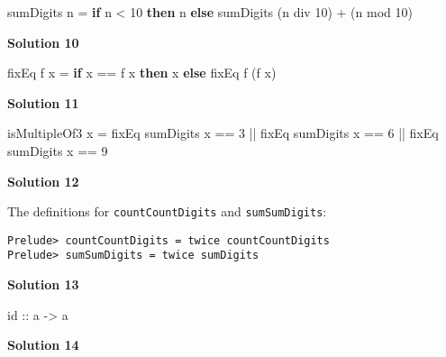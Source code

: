 \documentclass[11pt,
  american,
  DIV13]{article}
\newenvironment{Shaded}{}{}
\newcommand{\DecValTok}[1]{\textcolor[rgb]{0.25,0.63,0.44}{#1}}
\newcommand{\FunctionTok}[1]{\textcolor[rgb]{0.02,0.16,0.49}{#1}}
\newcommand{\KeywordTok}[1]{\textcolor[rgb]{0.00,0.44,0.13}{\textbf{#1}}}
\newcommand{\NormalTok}[1]{#1}
\newcommand{\OperatorTok}[1]{\textcolor[rgb]{0.40,0.40,0.40}{#1}}
\newcommand{\OtherTok}[1]{\textcolor[rgb]{0.00,0.44,0.13}{#1}}
\begin{document}
\begin{Shaded}
\begin{Highlighting}[]
\NormalTok{sumDigits n }\OtherTok{=} \KeywordTok{if}\NormalTok{ n }\OperatorTok{\textless{}} \DecValTok{10} \KeywordTok{then}\NormalTok{ n }\KeywordTok{else}\NormalTok{ sumDigits (n }\OtherTok{\textasciigrave{}div\textasciigrave{}} \DecValTok{10}\NormalTok{) }\OperatorTok{+}\NormalTok{ (n }\OtherTok{\textasciigrave{}mod\textasciigrave{}} \DecValTok{10}\NormalTok{)}
\end{Highlighting}
\end{Shaded}

\textbf{Solution 10}

\begin{Shaded}
\begin{Highlighting}[]
\NormalTok{fixEq f x }\OtherTok{=} \KeywordTok{if}\NormalTok{ x }\OperatorTok{==}\NormalTok{ f x }\KeywordTok{then}\NormalTok{ x }\KeywordTok{else}\NormalTok{ fixEq f (f x)}
\end{Highlighting}
\end{Shaded}

\textbf{Solution 11}

\begin{Shaded}
\begin{Highlighting}[]
\NormalTok{isMultipleOf3 x }\OtherTok{=}\NormalTok{ fixEq sumDigits x }\OperatorTok{==} \DecValTok{3} \OperatorTok{||}\NormalTok{ fixEq sumDigits x }\OperatorTok{==} \DecValTok{6} \OperatorTok{||}\NormalTok{ fixEq sumDigits x }\OperatorTok{==} \DecValTok{9}
\end{Highlighting}
\end{Shaded}

\textbf{Solution 12}

The definitions for \texttt{countCountDigits} and \texttt{sumSumDigits}:

\begin{verbatim}
Prelude> countCountDigits = twice countCountDigits
Prelude> sumSumDigits = twice sumDigits
\end{verbatim}

\textbf{Solution 13}

\begin{Shaded}
\begin{Highlighting}[]
\FunctionTok{id}\OtherTok{ ::}\NormalTok{ a }\OtherTok{{-}\textgreater{}}\NormalTok{ a}
\end{Highlighting}
\end{Shaded}

\textbf{Solution 14}
\end{document}

